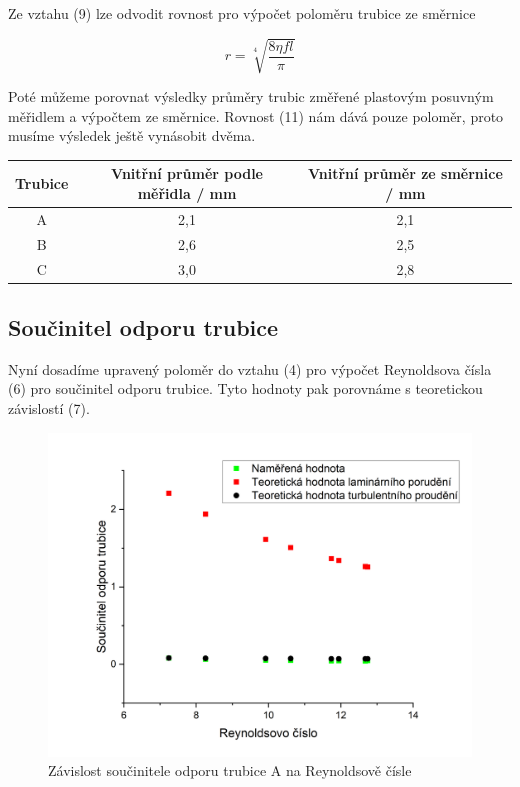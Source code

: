     Ze vztahu (9) lze odvodit rovnost pro výpočet poloměru trubice ze směrnice

    \begin{equation}
        r = \sqrt[4]{\frac{8\eta fl}{\pi}}
    \end{equation}

    Poté můžeme porovnat výsledky průměry trubic změřené plastovým posuvným měřidlem a výpočtem ze směrnice. Rovnost (11) nám dává pouze poloměr, proto musíme výsledek ještě vynásobit dvěma.

    \begin{table}[h]
        \centering
        \begin{tabular}{|c|c|c|} 
        \hline
            Trubice & Vnitřní průměr podle měřidla / mm & Vnitřní průměr ze směrnice / mm  \\ 
        \hline
            A       & 2,1                           & 2,1                              \\
            B       & 2,6                           & 2,5                              \\
            C       & 3,0                           & 2,8                              \\
        \hline
        \end{tabular}
    \end{table}

\subsection{Součinitel odporu trubice}

    Nyní dosadíme upravený poloměr do vztahu (4) pro výpočet Reynoldsova čísla (6) pro součinitel odporu trubice. Tyto hodnoty pak porovnáme s teoretickou závislostí (7).

    \begin{figure}[h]
        \centering
        \includegraphics[width=1\linewidth]{01 - Studium proudění viskózní kapaliny trubicemi kruhového průřezu//Protokol//img/Re(k) A.png}
        \caption{Závislost součinitele odporu trubice A na Reynoldsově čísle}
        \label{fig:Re(k) A}
    \end{figure}

